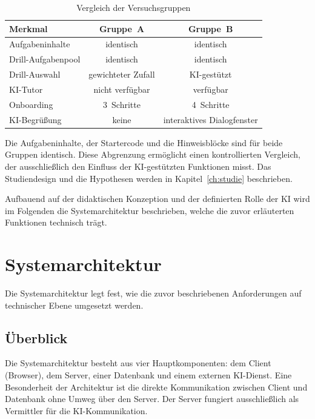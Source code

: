 \begin{table}[htbp]
\centering
\begin{tabular}{lcc}
\toprule
\textbf{Merkmal} & \textbf{Gruppe~A} & \textbf{Gruppe~B} \\
\midrule
Aufgabeninhalte          & identisch          & identisch \\
Drill-Aufgabenpool       & identisch          & identisch \\
Drill-Auswahl            & gewichteter Zufall  & KI-gestützt \\
KI-Tutor                 & nicht verfügbar     & verfügbar \\
Onboarding               & 3~Schritte          & 4~Schritte \\
KI-Begrüßung             & keine               & interaktives Dialogfenster \\
\bottomrule
\end{tabular}
\caption{Vergleich der Versuchsgruppen}
\label{tab:gruppenvergleich}
\end{table}

Die Aufgabeninhalte, der Startercode und die Hinweisblöcke sind für beide Gruppen identisch.
Diese Abgrenzung ermöglicht einen kontrollierten Vergleich, der ausschließlich den Einfluss der KI-gestützten Funktionen misst.
Das Studiendesign und die Hypothesen werden in Kapitel~\ref{ch:studie} beschrieben.

Aufbauend auf der didaktischen Konzeption und der definierten Rolle der KI wird im Folgenden die Systemarchitektur beschrieben, welche die zuvor erläuterten Funktionen technisch trägt.


\section{Systemarchitektur}\label{sec:architektur}

Die Systemarchitektur legt fest, wie die zuvor beschriebenen Anforderungen auf technischer Ebene umgesetzt werden.

\subsection{Überblick}\label{subsec:architektur-ueberblick}

Die Systemarchitektur besteht aus vier Hauptkomponenten: dem Client (Browser), dem Server, einer Datenbank und einem externen KI-Dienst.
Eine Besonderheit der Architektur ist die direkte Kommunikation zwischen Client und Datenbank ohne Umweg über den Server.
Der Server fungiert ausschließlich als Vermittler für die KI-Kommunikation.

